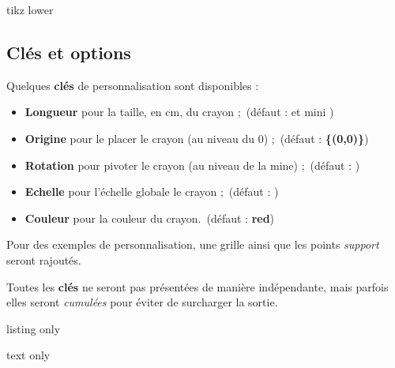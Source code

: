 \documentclass[french,a4paper,11pt]{article}
\newcommand\Cle[1]{{\bfseries\sffamily\textlangle #1\textrangle}}
\newcommand\affichegrille[4]{%
	\draw[xstep=1,ystep=1,lightgray] (#1,#3) grid (#2,#4) ;
	\foreach \x in {#1,\inteval{1+#1},...,#2} {\draw[lightgray] (\x,#4)--++(0,3pt) node[font=\scriptsize,above] {$\x$} ;}
	\foreach \y in {#3,\inteval{1+#3},...,#4} {\draw[lightgray] (#1,\y)--++(-3pt,0) node[font=\scriptsize,left] {$\y$} ;}
}
\newcommand\pointsutiles[1]{%
	\foreach \point in {#1} {\draw[thick,fill=red] \point circle[radius=3pt] ;}
}
\begin{document}
\begin{PresentationCode}{tikz lower}
\tkzCrayon
\end{PresentationCode}

\subsection{Clés et options}

\begin{tipblock}
Quelques \Cle{clés} de personnalisation sont disponibles :

\begin{itemize}
	\item \Cle{Longueur} pour la taille, en cm, du crayon ;\hfill~(défaut : \Cle{5} et mini \Cle{2.5})
	\item \Cle{Origine} pour le placer le crayon (au niveau du $0$) ;\hfill~(défaut : \Cle{\{(0,0)\}})
	\item \Cle{Rotation} pour pivoter le crayon (au niveau de la mine) ;\hfill~(défaut : \Cle{0})
	\item \Cle{Echelle} pour l'échelle globale le crayon ;\hfill~(défaut : \Cle{1})
	\item \Cle{Couleur} pour la couleur du crayon.\hfill~(défaut : \Cle{red})
\end{itemize}
\vspace*{-\baselineskip}\leavevmode
\end{tipblock}

\begin{noteblock}
Pour des exemples de personnalisation, une grille ainsi que les points \textit{support} seront rajoutés.

\smallskip

Toutes les \Cle{clés} ne seront pas présentées de manière indépendante, mais parfois elles seront \textit{cumulées} pour éviter de surcharger la sortie.
\end{noteblock}

\begin{PresentationCode}{listing only}
\tkzCrayon[Origine={(-3,-2)},Echelle=0.75,Rotation=45,Couleur=DarkBlue]
\tkzCrayon[Origine={(1,-4)},Longueur=10,Rotation=-30,Couleur=Green]
\tkzCrayon[Origine={(-3,3)},Echelle=1.25,Rotation=195,Couleur=orange]
\end{PresentationCode}

\begin{PresentationCode}{text only}
\end{PresentationCode}
\end{document}

